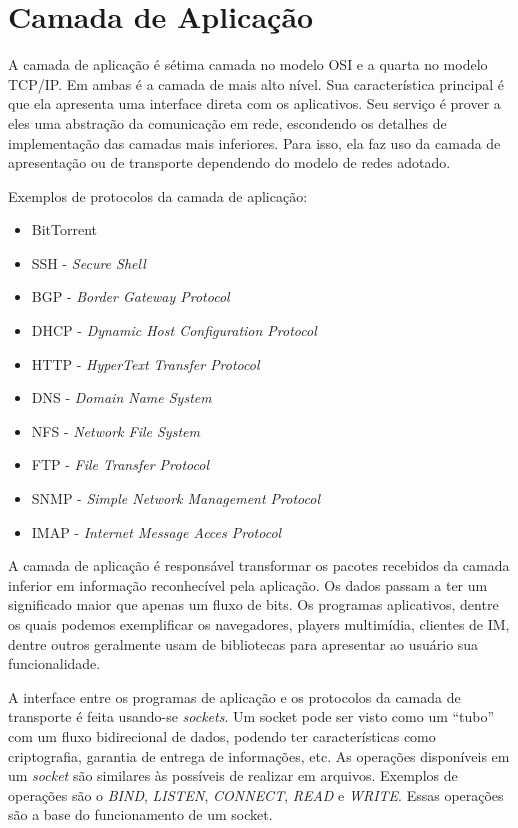 \documentclass[brazil,times,12pt]{abnt}
\begin{document}
\section*{Camada de Aplicação}
	A camada de aplicação é sétima camada no modelo OSI e a quarta no modelo
	TCP/IP. Em ambas é a camada de mais alto nível. Sua característica principal é
	que ela apresenta uma interface direta com os aplicativos. Seu serviço
	é prover a eles uma abstração da comunicação em rede, escondendo os detalhes
	de implementação das camadas mais inferiores. Para isso, ela faz uso da
	camada de apresentação ou de transporte dependendo do modelo de redes
	adotado.

	Exemplos de protocolos da camada de aplicação:
	
	\begin{itemize}
		\item BitTorrent
		\item SSH - \emph{Secure Shell}
		\item BGP - \emph{Border Gateway Protocol}
		\item DHCP - \emph{Dynamic Host Configuration Protocol}
		\item HTTP - \emph{HyperText Transfer Protocol}
		\item DNS - \emph{Domain Name System}
		\item NFS - \emph{Network File System}
		\item FTP - \emph{File Transfer Protocol}
		\item SNMP - \emph{Simple Network Management Protocol}
		\item IMAP - \emph{Internet Message Acces Protocol}
		
	\end{itemize}
	
	A camada de aplicação é responsável transformar os pacotes recebidos da camada
	inferior em informação reconhecível pela aplicação. Os dados passam a ter um
	significado maior que apenas um fluxo de bits. Os programas aplicativos, dentre
	os quais podemos exemplificar os navegadores, players multimídia, clientes de
	IM, dentre outros geralmente usam de bibliotecas para apresentar ao usuário sua
	funcionalidade.
	
	A interface entre os programas de aplicação e os protocolos da camada de
	transporte é feita usando-se \emph{sockets}. Um socket pode ser visto como um
	``tubo'' com um fluxo bidirecional de dados, podendo ter características como
	criptografia, garantia de entrega de informações, etc. As operações disponíveis
	em um \emph{socket} são similares às possíveis de realizar em arquivos.
	Exemplos de operações são o \emph{BIND}, \emph{LISTEN}, \emph{CONNECT},
	\emph{READ} e \emph{WRITE}. Essas operações são a base do funcionamento de um
	socket.
\end{document}
